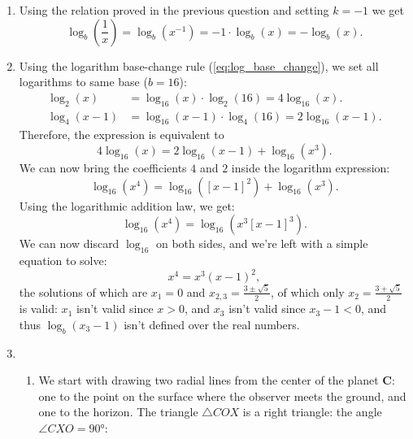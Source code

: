 \begin{enumerate}
	\item Using the relation proved in the previous question and setting $k=-1$ we get
		\[
			\log_{b} \left( \frac{1}{x} \right) = \log_{b} \left( x^{-1} \right) = -1\cdot\log_{b}(x) = -\log_{b}(x).
		\]

	\item Using the logarithm base-change rule (\autoref{eq:log_base_change}), we set all logarithms to same base ($b=16$):
		\begin{align*}
			\log_{2}(x) &= \log_{16}(x)\cdot\log_{2}(16) = 4\log_{16}(x).\\
			\log_{4}(x-1) &= \log_{16}(x-1)\cdot\log_{4}(16) = 2\log_{16}(x-1).
		\end{align*}
		Therefore, the expression is equivalent to
		\[
			4\log_{16}(x) = 2\log_{16}(x-1) + \log_{16}(x^{3}).
		\]
		We can now bring the coefficients $4$ and $2$ inside the logarithm expression:
		\[
			\log_{16}(x^{4}) = \log_{16}(\left[x-1\right]^{2}) + \log_{16}\left(x^{3}\right).
		\]
		Using the logarithmic addition law, we get:
		\[
			\log_{16}(x^{4}) = \log_{16}(x^{3}\left[x-1\right]^{3}).
		\]
		We can now discard $\log_{16}$ on both sides, and we're left with a simple equation to solve:
		\[
			x^{4} = x^{3} \left( x-1 \right)^{2},
		\]
		the solutions of which are $x_{1}=0$ and $x_{2,3}=\frac{3\pm\sqrt{5}}{2}$, of which only $x_{2} = \frac{3+\sqrt{5}}{2}$ is valid: $x_{1}$ isn't valid since $x>0$, and $x_{3}$ isn't valid since $x_{3}-1<0$, and thus $\log_{b}\left(x_{3}-1\right)$ isn't defined over the real numbers.

	\item 
		\begin{enumerate}[label=(\roman*)]
			\item
		We start with drawing two radial lines from the center of the planet $\bm{C}$: one to the point on the surface where the observer meets the ground, and one to the horizon. The triangle $\triangle COX$ is a right triangle: the angle $\angle CXO=\ang{90}$:
		

\end{enumerate}
\end{enumerate}
